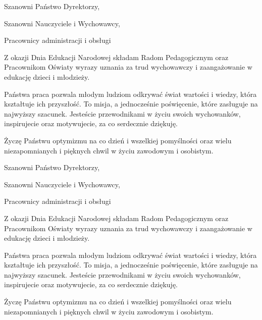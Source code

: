 \documentclass[12pt, letterpaper, titlepage]{article}
\begin{document}
Szanowni Państwo Dyrektorzy,

Szanowni Nauczyciele i Wychowawcy,

Pracownicy administracji i obsługi

Z okazji Dnia Edukacji Narodowej składam Radom Pedagogicznym oraz Pracownikom Oświaty wyrazy uznania za trud wychowawczy i zaangażowanie w edukację dzieci i młodzieży.

Państwa praca pozwala młodym ludziom odkrywać świat wartości i wiedzy, która kształtuje ich przyszłość. To misja, a jednocześnie poświęcenie, które zasługuje na najwyższy szacunek. Jesteście przewodnikami w życiu swoich wychowanków, inspirujecie oraz motywujecie, za co serdecznie dziękuję.

Życzę Państwu optymizmu na co dzień i wszelkiej pomyślności oraz wielu niezapomnianych i pięknych chwil w życiu zawodowym i osobistym.

Szanowni Państwo Dyrektorzy,

Szanowni Nauczyciele i Wychowawcy,

Pracownicy administracji i obsługi

Z okazji Dnia Edukacji Narodowej składam Radom Pedagogicznym oraz Pracownikom Oświaty wyrazy uznania za trud wychowawczy i zaangażowanie w edukację dzieci i młodzieży.

Państwa praca pozwala młodym ludziom odkrywać świat wartości i wiedzy, która kształtuje ich przyszłość. To misja, a jednocześnie poświęcenie, które zasługuje na najwyższy szacunek. Jesteście przewodnikami w życiu swoich wychowanków, inspirujecie oraz motywujecie, za co serdecznie dziękuję.

Życzę Państwu optymizmu na co dzień i wszelkiej pomyślności oraz wielu niezapomnianych i pięknych chwil w życiu zawodowym i osobistym.
\end{document}
